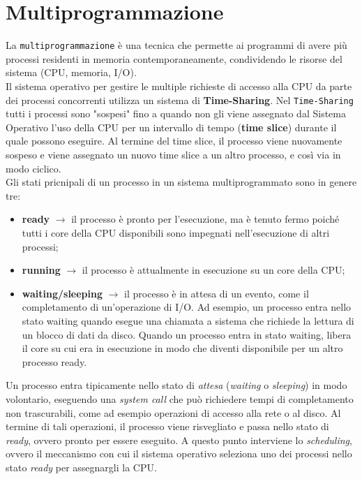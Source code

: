 \section{Multiprogrammazione}
La \texttt{multiprogrammazione} è una tecnica che permette ai programmi di avere più processi residenti in memoria contemporaneamente, condividendo le risorse del sistema (CPU, memoria, I/O).\\
Il sistema operativo per gestire le multiple richieste di accesso alla CPU da parte dei processi concorrenti utilizza un sistema di \textbf{Time-Sharing}. Nel \texttt{Time-Sharing} tutti i processi sono "sospesi" fino a quando
non gli viene assegnato dal Sistema Operativo l'uso della CPU per un intervallo di tempo (\textbf{time slice}) durante il quale possono eseguire. Al termine del time slice, il processo 
viene nuovamente sospeso e viene assegnato un nuovo time slice a un altro processo, e così via in modo ciclico.\\
Gli stati pricnipali di un processo in un sistema multiprogrammato sono in genere tre:
\begin{itemize}
    \item \textbf{ready} $\rightarrow$ il processo è pronto per l'esecuzione, ma è tenuto fermo poiché tutti i core 
    della CPU disponibili sono impegnati nell'esecuzione di altri processi;
    \item \textbf{running} $\rightarrow$ il processo è attualmente in esecuzione su un core della CPU;
    \item \textbf{waiting/sleeping} $\rightarrow$ il processo è in attesa di un evento, come il completamento di un'operazione di I/O. Ad esempio, un processo entra nello stato waiting quando esegue una chiamata a sistema 
    che richiede la lettura di un blocco di dati da disco. Quando un processo entra in stato waiting, libera il core su cui era in esecuzione in modo che diventi disponibile per un altro processo ready.
\end{itemize}
\noindent Un processo entra tipicamente nello stato di \textit{attesa} (\textit{waiting} o \textit{sleeping}) in modo volontario, eseguendo una \textit{system call} che può richiedere tempi di completamento non trascurabili, come ad esempio operazioni di accesso alla rete o al disco.
Al termine di tali operazioni, il processo viene risvegliato e passa nello stato di \textit{ready}, ovvero pronto per essere eseguito. A questo punto interviene lo \textit{scheduling}, ovvero il meccanismo con cui il sistema operativo seleziona uno dei processi nello stato \textit{ready} per assegnargli la CPU.
